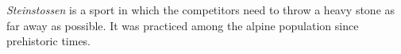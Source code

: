 \emph{Steinstossen} is a sport in which the competitors need to throw a heavy
stone as far away as possible. It was practiced among the alpine population since prehistoric times.
